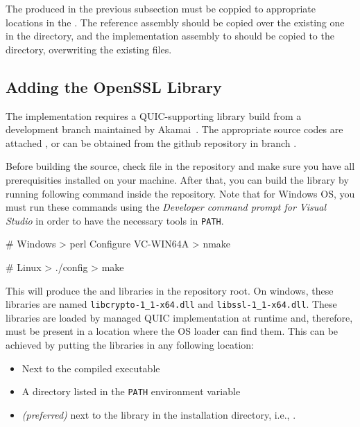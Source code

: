 The \SystemNetQuicDll{} produced in the previous subsection must be coppied to appropriate locations
in the . The reference \SystemNetQuicDll{} assembly should be copied over the
existing one in the
 directory, and
the implementation assembly to should be copied to the
 directory, overwriting the
existing files.

\subsection{Adding the OpenSSL Library}

The implementation requires a QUIC-supporting \libopenssl{} library build from a development branch
maintained by Akamai~\cite{AkamaiOpensslGithub}. The appropriate source codes are attached
, or can be obtained from the github repository in branch .

Before building the source, check  file in the repository and make sure you
have all prerequisities installed on your machine. After that, you can build the \libopenssl{}
library by running following command inside the repository. Note that for Windows OS, you must run
these commands using the \textit{Developer command prompt for Visual Studio} in order to have the necessary tools in
\texttt{PATH}.

\begin{myVerbatim}
# Windows
> perl Configure VC-WIN64A
> nmake

# Linux
> ./config
> make
\end{myVerbatim}

This will produce the  and  libraries in the \libopenssl{}
repository root. On windows, these libraries are named \texttt{libcrypto-1_1-x64.dll} and
\texttt{libssl-1_1-x64.dll}. These libraries are loaded by managed QUIC implementation at runtime
and, therefore, must be present in a location where the OS loader can find them. This can be achieved by putting the libraries in any following location:

\begin{itemize}

  \item Next to the compiled executable

  \item A directory listed in the \texttt{PATH} environment variable

  \item \textit{(preferred)} next to the \SystemNetQuicDll{} library in the \dotnet{} installation directory, i.e., .

\end{itemize}

